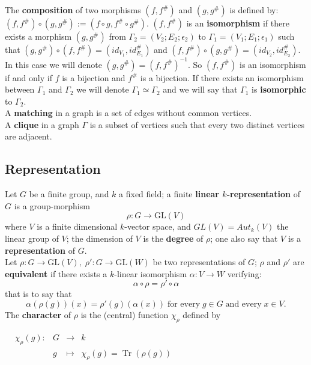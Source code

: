 \documentclass[preprint,12pt,authoryear]{elsarticle}
\theoremstyle{definition}
\DeclareMathOperator{\Tr}{Tr}
\begin{document}
The {\bf composition} of two morphisms $(f, f^{\#})$ and $(g,
g^{\#})$ is defined by: $(f, f^{\#})\circ (g, g^{\#}):= (f \circ
g, f^{\#}\circ g^{\#})$. $(f, f^{\#})$ is an {\bf isomorphism} if
there exists a morphism $(g, g^{\#})$ from $\Gamma_{2} =(V_{2};
E_{2}; \epsilon_{2})$ to $\Gamma_{1} =(V_{1}; E_{1};
\epsilon_{1})$ such that $(g, g^{\#})\circ (f, f^{\#})=
(id_{V_{1}}, id^{\#}_{E_{1}})$ and
$(f, f^{\#})\circ (g, g^{\#}) = (id_{V_{2}}, id^{\#}_{E_{2}})$.
In this case we will denote $(g, g^{\#}) = (f, f^{\#})^{-1}$. So $(f, f^{\#})$ is an
isomorphism if and only if $f$ is a bijection and $f^{\#}$ is a bijection.
If there exists an isomorphism between $\Gamma_{1}$ and $\Gamma_{2}$ we will denote $\Gamma_{1}\simeq \Gamma_{2}$ and
we will say that $\Gamma_{1}$ is {\bf isomorphic} to $\Gamma_{2}$.\\
A {\bf matching} in a graph is a set of edges without common vertices.\\
A {\bf clique} in a graph $\Gamma$  is a subset of vertices  such that every two distinct vertices are adjacent.


\subsection{Representation}
Let  $G$  be a finite group, 
and $k$ a fixed field; a  finite {\bf linear $k$-representation} of $G$ is  a group-morphism 
\[
\rho \colon G \to \mathrm{GL}(V)
\]
where $V$ is a finite dimensional $k$-vector space, and  $GL(V)=Aut_k(V)$ the  linear group of $V$; the dimension of $V$ is the {\bf degree} of $\rho$; one also say that $V$ is a {\bf representation} of $G$.\\

Let $\rho \colon G \to \mathrm{GL}(V),\; \rho' \colon G \to \mathrm{GL}(W)$ be two representations of $G$;
 $\rho$ and $\rho'$ are {\bf  equivalent} if there exists a $k$-linear isomorphism $\alpha: V\longrightarrow W$ verifying:
\[
\alpha\circ\rho= \rho'\circ\alpha
\]
that is to say that
\[
\alpha(\rho(g))(x)= \rho'(g)(\alpha(x))\; \textrm{for every}\;  g\in G\; \textrm{and every}\; x\in V.
\]
The {\bf character} of $\rho$ is the (central) function $\chi_{\rho}$ defined by

$\begin{array}{ccccl}
&\chi_{\rho}(g) : & G & \longrightarrow  & k\\
 & & g & \longmapsto  &\chi_{\rho}(g)= \Tr(\rho(g))\\
\end{array}$\\
\end{document}
